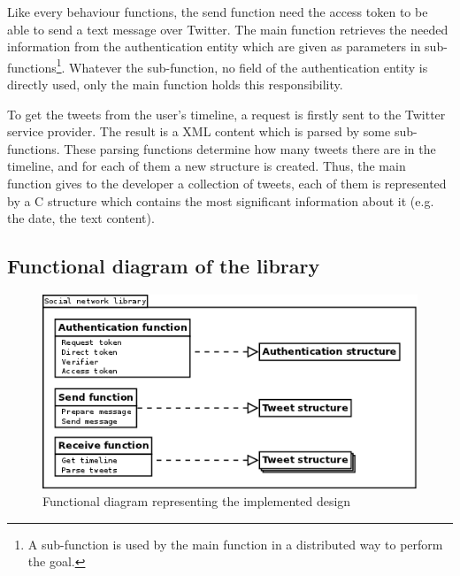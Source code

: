 Like every behaviour functions, the send function need the access token to be able to send a text message over Twitter. The main function retrieves the needed information from the authentication entity which are given as parameters in sub-functions\footnote{A sub-function is used by the main function in a distributed way to perform the goal.}. Whatever the sub-function, no field of the authentication entity is directly used, only the main function holds this responsibility.

To get the tweets from the user's timeline, a request is firstly sent to the Twitter service provider. The result is a XML content which is parsed by some sub-functions. These parsing functions determine how many tweets there are in the timeline, and for each of them a new structure is created. Thus, the main function gives to the developer a collection of tweets, each of them is represented by a C structure which contains the most significant information about it (e.g. the date, the text content).


\subsection{Functional diagram of the library}

\begin{figure}[h]
  \centering
  \includegraphics[scale=0.75]{images/functional_design.png}
  \caption{Functional diagram representing the implemented design}
\end{figure}


\clearpage